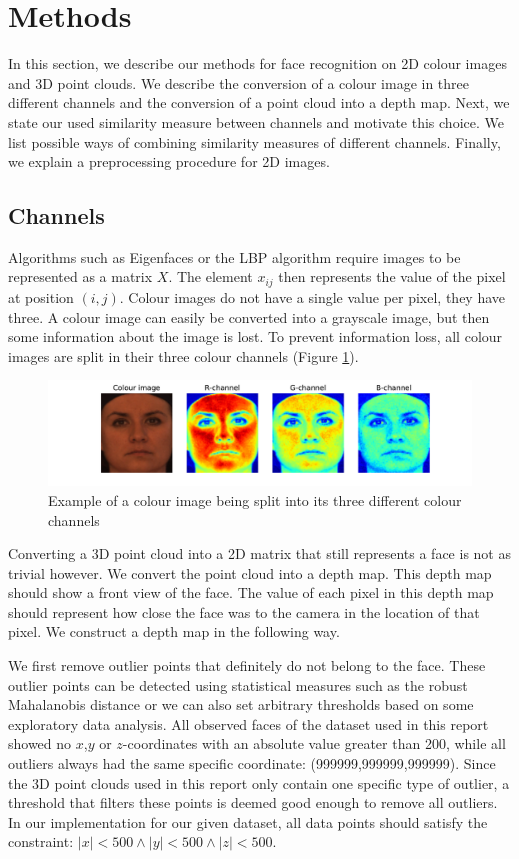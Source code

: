 \documentclass[]{article}
\begin{document}
\section{Methods}
\graphicspath{{img/methods/}}
In this section, we describe our methods for face recognition on 2D colour images and 3D point clouds. We describe the conversion of a colour image in three different channels and the conversion of a point cloud into a depth map. Next, we state our used similarity measure between channels and motivate this choice. We list possible ways of combining similarity measures of different channels. Finally, we explain a preprocessing procedure for 2D images.

\subsection{Channels}
Algorithms such as Eigenfaces or the LBP algorithm require images to be represented as a matrix $X$. The element $x_{ij}$ then represents the value of the pixel at position $(i,j)$. Colour images do not have a single value per pixel, they have three. A colour image can easily be converted into a grayscale image, but then some information about the image is lost. To prevent information loss,  all colour images are split in their three colour channels (Figure \ref{fig:colour-channels}).

\begin{figure}
	\centering
	\includegraphics[width=\textwidth]{coloursplitting.pdf}
	\caption{Example of a colour image being split into its three different colour channels}
	\label{fig:colour-channels}
\end{figure}

Converting a 3D point cloud into a 2D matrix that still represents a face is not as trivial however. We convert the point cloud into a depth map. This depth map should show a front view of the face. The value of each pixel in this depth map should represent how close the face was to the camera in the location of that pixel. We construct a depth map in the following way.

We first remove outlier points that definitely do not belong to the face. These outlier points can be detected using statistical measures such as the robust Mahalanobis distance or we can also set arbitrary thresholds based on some exploratory data analysis. All observed faces of the dataset used in this report showed no $x$,$y$ or $z$-coordinates with an absolute value greater than 200, while all outliers always had the same specific coordinate: (999999,999999,999999). Since the 3D point clouds used in this report only contain one specific type of outlier, a threshold that filters these points is deemed good enough to remove all outliers. In our implementation for our given dataset, all data points should satisfy the constraint: $|x|<500 \wedge |y| < 500 \wedge |z| < 500$.
\end{document}
